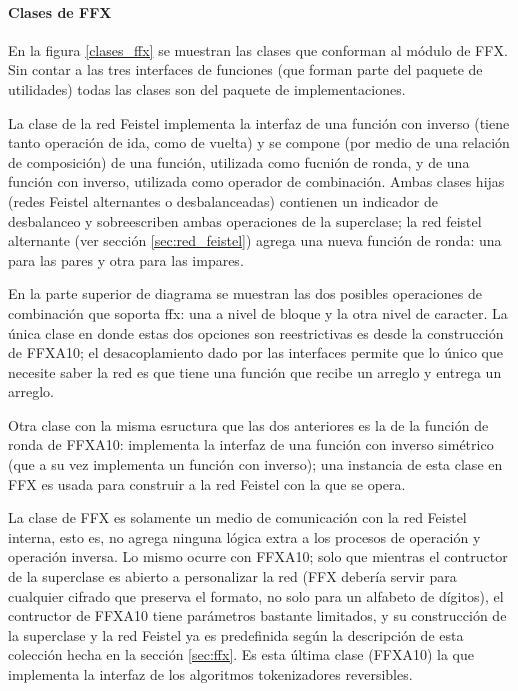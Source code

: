 \paragraph{Clases de FFX}

En la figura \ref{clases_ffx} se muestran las clases que conforman al módulo de
FFX. Sin contar a las tres interfaces de funciones (que forman parte del paquete
de utilidades) todas las clases son del paquete de implementaciones.

La clase de la red Feistel implementa la interfaz de una función con inverso
(tiene tanto operación de ida, como de vuelta) y se compone (por medio de una
relación de composición) de una función, utilizada como fucnión de ronda, y de
una función con inverso, utilizada como operador de combinación. Ambas clases
hijas (redes Feistel alternantes o desbalanceadas) contienen un indicador de
desbalanceo y sobreescriben ambas operaciones de la superclase; la red feistel
alternante (ver sección \ref{sec:red_feistel}) agrega una nueva función
de ronda: una para las pares y otra para las impares.

En la parte superior de diagrama se muestran las dos posibles operaciones de
combinación que soporta ffx: una a nivel de bloque y la otra nivel de caracter.
La única clase en donde estas dos opciones son reestrictivas es desde la
construcción de FFXA10; el desacoplamiento dado por las interfaces permite que
lo único que necesite saber la red es que tiene una función que recibe un
arreglo y entrega un arreglo.

Otra clase con la misma esructura que las dos anteriores es la de la función de
ronda de FFXA10: implementa la interfaz de una función con inverso simétrico
(que a su vez implementa un función con inverso); una instancia de esta clase
en FFX es usada para construir a la red Feistel con la que se opera.

La clase de FFX es solamente un medio de comunicación con la red Feistel
interna, esto es, no agrega ninguna lógica extra a los procesos de operación y
operación inversa. Lo mismo ocurre con FFXA10; solo que mientras el contructor
de la superclase es abierto a personalizar la red (FFX debería servir para
cualquier cifrado que preserva el formato, no solo para un alfabeto de
dígitos), el contructor de FFXA10 tiene parámetros bastante limitados, y su
construcción de la superclase y la red Feistel ya es predefinida según la
descripción de esta colección hecha en la sección \ref{sec:ffx}. Es esta última
clase (FFXA10) la que implementa la interfaz de los algoritmos tokenizadores
reversibles.

